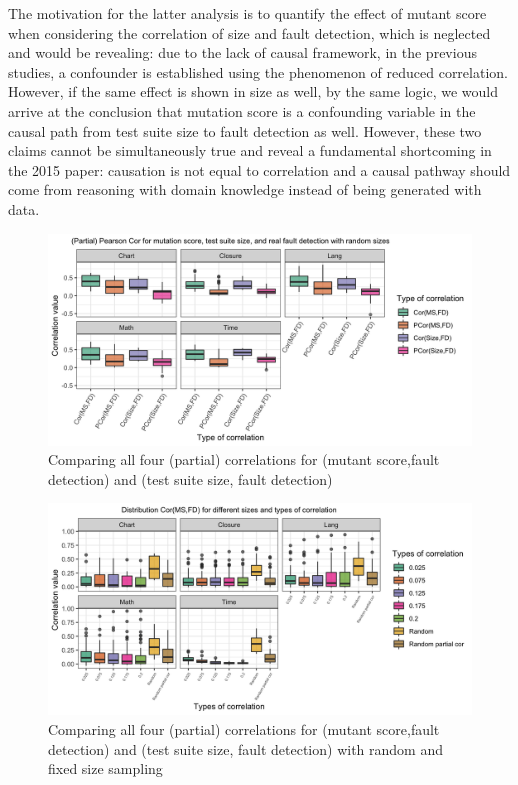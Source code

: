 \documentclass[10pt,letterpaper]{article}
\begin{document}
The motivation for the latter analysis is to quantify the effect of mutant score when considering the correlation of size and fault detection, which is neglected and would be revealing: due to the lack of causal framework, in the previous studies, a confounder is established using the phenomenon of reduced correlation. However, if the same effect is shown in size as well, by the same  logic, we would arrive at the conclusion that mutation score is a confounding variable in the causal path from test suite size to fault detection as well. However, these two claims cannot be simultaneously true and reveal a fundamental shortcoming in the 2015 paper: causation is not equal to correlation and a causal pathway should come from reasoning with domain knowledge instead of being generated with data.     

  \begin{figure}[ht!]
        \centering
        \includegraphics[scale=0.15]{figures/partial_cor_plot.png}
        \caption{Comparing all four (partial) correlations for (mutant score,fault detection) and (test suite size, fault detection) }
        \label{fig:all_4_cor}
    \end{figure}

  \begin{figure}[ht!]
        \centering
        \includegraphics[scale=0.15]{figures/partial_cor_random_fixed.png}
        \caption{Comparing all four (partial) correlations for (mutant score,fault detection) and (test suite size, fault detection) with random and fixed size sampling}
        \label{fig:par_cor_ms_fd}
    \end{figure}
\end{document}
